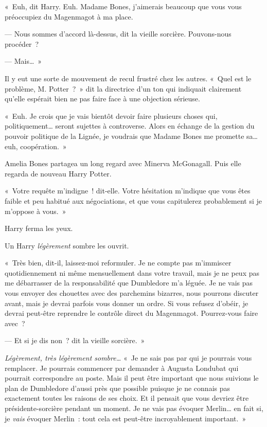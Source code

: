 «~Euh, dit Harry. Euh. Madame Bones, j'aimerais beaucoup que vous vous préoccupiez du Magenmagot à ma place.

--- Nous sommes d'accord là-dessus, dit la vieille sorcière. Pouvons-nous procéder~?

--- Mais…~»

Il y eut une sorte de mouvement de recul frustré chez les autres. «~Quel est le problème, M. Potter~?~» dit la directrice d'un ton qui indiquait clairement qu'elle espérait bien ne pas faire face à une objection sérieuse.

«~Euh. Je crois que je vais bientôt devoir faire plusieurs choses qui, politiquement… seront sujettes à controverse. Alors en échange de la gestion du pouvoir politique de la Lignée, je voudrais que Madame Bones me promette sa… euh, coopération.~»

Amelia Bones partagea un long regard avec Minerva McGonagall. Puis elle regarda de nouveau Harry Potter.

«~Votre requête m'indigne~! dit-elle. Votre hésitation m'indique que vous êtes faible et peu habitué aux négociations, et que vous capitulerez probablement si je m'oppose à vous.~»

Harry ferma les yeux.

Un Harry \emph{légèrement} sombre les ouvrit.

«~Très bien, dit-il, laissez-moi reformuler. Je ne compte pas m'immiscer quotidiennement ni même mensuellement dans votre travail, mais je ne peux pas me débarrasser de la responsabilité que Dumbledore m'a léguée. Je ne vais pas vous envoyer des chouettes avec des parchemins bizarres, nous pourrons discuter avant, mais je devrai parfois vous donner un ordre. Si vous refusez d'obéir, je devrai peut-être reprendre le contrôle direct du Magenmagot. Pourrez-vous faire avec~?

--- Et si je dis non~? dit la vieille sorcière.~»

\emph{Légèrement, très légèrement sombre…} «~Je ne sais pas par qui je pourrais vous remplacer. Je pourrais commencer par demander à Augusta Londubat qui pourrait correspondre au poste. Mais il peut être important que nous suivions le plan de Dumbledore d'aussi près que possible puisque je ne connais pas exactement toutes les raisons de ses choix. Et il pensait que vous devriez être présidente-sorcière pendant un moment. Je ne vais pas évoquer Merlin… en fait si, je \emph{vais} évoquer Merlin~: tout cela est peut-être incroyablement important.~»

